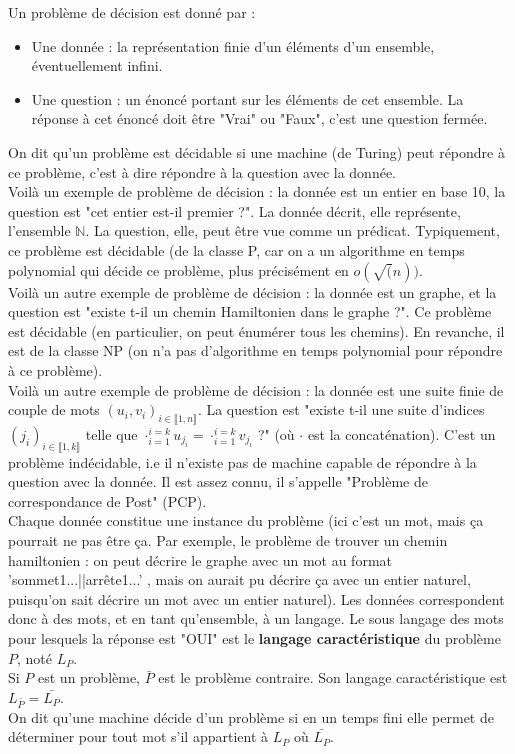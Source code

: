 \documentclass{article}
\newcommand{\N}{\mathbb{N}}
\begin{document}
Un problème de décision est donné par :
\begin{itemize}
    \item Une donnée : la représentation finie d'un éléments d'un ensemble, éventuellement infini. 
    \item Une question : un énoncé portant sur les éléments de cet ensemble. La réponse à cet énoncé doit être "Vrai" ou "Faux", c'est une question fermée.
\end{itemize}
On dit qu'un problème est décidable si une machine (de Turing) peut répondre à ce problème, c'est à dire répondre à la question avec la donnée. \\
Voilà un exemple de problème de décision : la donnée est un entier en base 10, la question est "cet entier est-il premier ?". La donnée décrit, elle représente, l'ensemble $\N$. La question, elle, peut être vue comme un prédicat. Typiquement, ce problème est décidable (de la classe P, car on a un algorithme en temps polynomial qui décide ce problème, plus précisément en $o(\sqrt(n))$. \\
Voilà un autre exemple de problème de décision : la donnée est un graphe, et la question est "existe t-il un chemin Hamiltonien dans le graphe ?". Ce problème est décidable (en particulier, on peut énumérer tous les chemins). En revanche, il est de la classe NP (on n'a pas d'algorithme en temps polynomial pour répondre à ce problème). \\ 

Voilà un autre exemple de problème de décision : la donnée est une suite finie de couple de mots $(u_i,v_i)_{i \in \llbracket 1, n \rrbracket}$. La question est "existe t-il une suite d'indices $(j_i)_{i \in \llbracket 1, k \rrbracket} $ telle que $ \cdot_{i = 1}^{i=k} u_{j_i} = \cdot_{i = 1}^{i=k} v_{j_i} $ ?" (où $\cdot$ est la concaténation). C'est un problème indécidable, i.e il n'existe pas de machine capable de répondre à la question avec la donnée. Il est assez connu, il s'appelle "Problème de correspondance de Post" (PCP). \\ 
Chaque donnée constitue une instance du problème (ici c'est un mot, mais ça pourrait ne pas être ça. Par exemple, le problème de trouver un chemin hamiltonien : on peut décrire le graphe avec un mot au format 'sommet1...||arrête1...' , mais on aurait pu décrire ça avec un entier naturel, puisqu'on sait décrire un mot avec un entier naturel). Les données correspondent donc à des mots, et en tant qu'ensemble, à un langage. Le sous langage des mots pour lesquels la réponse est "OUI" est le \textbf{langage caractéristique} du problème $P$, noté $L_P$. \\ 
Si $P$ est un problème, $\bar{P}$ est le problème contraire. Son langage caractéristique est $L_{\bar{P}} = \bar{L_P}$. \\ 
On dit qu'une machine décide d'un problème si en un temps fini elle permet de déterminer pour tout mot s'il appartient à $L_P$ où $\bar{L_P}$.
\end{document}
